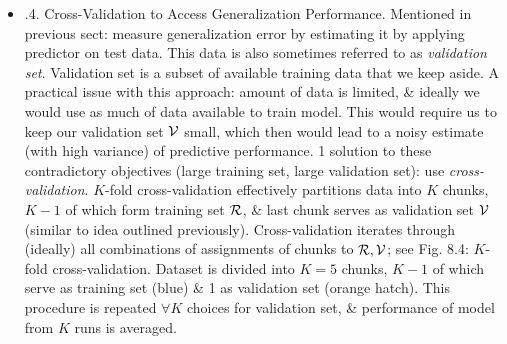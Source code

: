 \documentclass{article}
\begin{document}
\begin{itemize}
\begin{itemize}
\begin{itemize}
			\item {.4. Cross-Validation to Access Generalization Performance.} Mentioned in previous sect: measure generalization error by estimating it by applying predictor on test data. This data is also sometimes referred to as {\it validation set}. Validation set is a subset of available training data that we keep aside. A practical issue with this approach: amount of data is limited, \& ideally we would use as much of data available to train model. This would require us to keep our validation set ${\cal V}$ small, which then would lead to a noisy estimate (with high variance) of predictive performance. 1 solution to these contradictory objectives (large training set, large validation set): use {\it cross-validation}. $K$-fold cross-validation effectively partitions data into $K$ chunks, $K - 1$ of which form training set ${\cal R}$, \& last chunk serves as validation set ${\cal V}$ (similar to idea outlined previously). Cross-validation iterates through (ideally) all combinations of assignments of chunks to ${\cal R},{\cal V}$; see {\sf Fig. 8.4: $K$-fold cross-validation. Dataset is divided into $K = 5$ chunks, $K - 1$ of which serve as training set (blue) \& 1 as validation set (orange hatch).} This procedure is repeated $\forall K$ choices for validation set, \& performance of model from $K$ runs is averaged.
			

\end{itemize}
\end{itemize}
\end{itemize}
\end{document}

